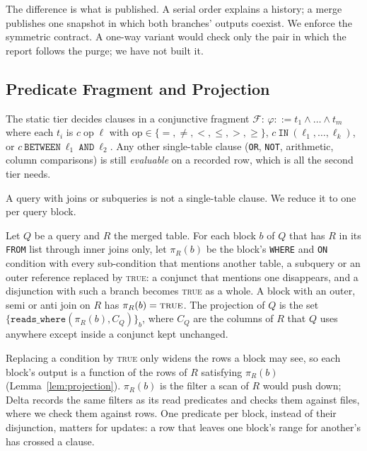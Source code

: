 \documentclass[sigconf, nonacm]{acmart}
\begin{document}
The difference is what is published. A serial order explains a history; a merge publishes one snapshot in which both branches' outputs coexist. We enforce the symmetric contract. A one-way variant would check only the pair in which the report follows the purge; we have not built it.

\subsection{Predicate Fragment and Projection}
\label{sec:model_fragment}

The static tier decides clauses in a conjunctive fragment $\mathcal{F}$: $\varphi ::= t_1 \land \dots \land t_m$ where each $t_i$ is $c \;\text{op}\; \ell$ with $\text{op} \in \{=, \neq, <, \le, >, \ge\}$, $c\ \texttt{IN}\ (\ell_1, \dots, \ell_k)$, or $c\ \texttt{BETWEEN}\ \ell_1\ \texttt{AND}\ \ell_2$. Any other single-table clause (\texttt{OR}, \texttt{NOT}, arithmetic, column comparisons) is still \emph{evaluable} on a recorded row, which is all the second tier needs.

A query with joins or subqueries is not a single-table clause. We reduce it to one per query block.

\begin{definition}
\label{def:projection}
Let $Q$ be a query and $R$ the merged table. For each block $b$ of $Q$ that has $R$ in its \texttt{FROM} list through inner joins only, let $\pi_R(b)$ be the block's \texttt{WHERE} and \texttt{ON} condition with every sub-condition that mentions another table, a subquery or an outer reference replaced by \textsc{true}: a conjunct that mentions one disappears, and a disjunction with such a branch becomes \textsc{true} as a whole. A block with an outer, semi or anti join on $R$ has $\pi_R(b) = \textsc{true}$. The projection of $Q$ is the set $\{\texttt{reads\_where}(\pi_R(b), C_Q)\}_b$, where $C_Q$ are the columns of $R$ that $Q$ uses anywhere except inside a conjunct kept unchanged.
\end{definition}

Replacing a condition by \textsc{true} only widens the rows a block may see, so each block's output is a function of the rows of $R$ satisfying $\pi_R(b)$ (Lemma~\ref{lem:projection}). $\pi_R(b)$ is the filter a scan of $R$ would push down; Delta records the same filters as its read predicates and checks them against files, where we check them against rows. One predicate per block, instead of their disjunction, matters for updates: a row that leaves one block's range for another's has crossed a clause.
\end{document}
